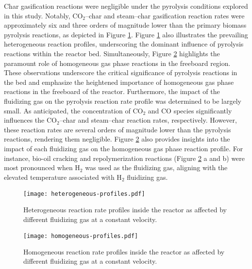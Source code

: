 Char gasification reactions were negligible under the pyrolysis conditions explored in this study. Notably, CO$_2$–char and steam–char gasification reaction rates were approximately six and three orders of magnitude lower than the primary biomass pyrolysis reactions, as depicted in Figure \ref{fig:heterogeneous-profiles}. Figure \ref{fig:heterogeneous-profiles} also illustrates the prevailing heterogeneous reaction profiles, underscoring the dominant influence of pyrolysis reactions within the reactor bed. Simultaneously, Figure \ref{fig:homogeneous-profiles} highlights the paramount role of homogeneous gas phase reactions in the freeboard region. These observations underscore the critical significance of pyrolysis reactions in the bed and emphasize the heightened importance of homogeneous gas phase reactions in the freeboard of the reactor. Furthermore, the impact of the fluidizing gas on the pyrolysis reaction rate profile was determined to be largely small. As anticipated, the concentration of CO$_2$ and CO species significantly influences the CO$_2$–char and steam–char reaction rates, respectively. However, these reaction rates are several orders of magnitude lower than the pyrolysis reactions, rendering them negligible. Figure \ref{fig:homogeneous-profiles} also provides insights into the impact of each fluidizing gas on the homogeneous gas phase reaction profile. For instance, bio-oil cracking and repolymerization reactions (Figure \ref{fig:homogeneous-profiles} a and b) were most pronounced when H$_2$ was used as the fluidizing gas, aligning with the elevated temperature associated with H$_2$ fluidizing gas.

\begin{figure}[H]
    \centering
    \texttt{[image: heterogeneous-profiles.pdf]}
    \caption{Heterogeneous reaction rate profiles inside the reactor as affected by different fluidizing gas at a constant velocity.}
    \label{fig:heterogeneous-profiles}
\end{figure}

\begin{figure}[H]
    \centering
    \texttt{[image: homogeneous-profiles.pdf]}
    \caption{Homogeneous reaction rate profiles inside the reactor as affected by different fluidizing gas at a constant velocity.}
    \label{fig:homogeneous-profiles}
\end{figure}

